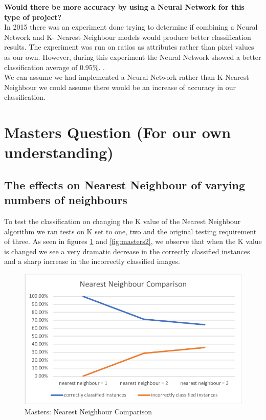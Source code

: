 \documentclass[12pt]{article}
\begin{document}
\textbf{Would there be more accuracy by using a Neural Network for this type of project?}\\

In 2015 there was an experiment done trying to determine if combining a Neural Network and K- Nearest Neighbour models would produce better classification results. The experiment was run on ratios as attributes rather than pixel values as our own. However, during this experiment the Neural Network showed a better classification average of 0.95\%. \cite{hai_2015}.\\

We can assume we had implemented a Neural Network rather than K-Nearest Neighbour we could assume there would be an increase of accuracy in our classification.\\


\section{Masters Question (For our own understanding)}

\subsection{The effects on Nearest Neighbour of varying numbers of neighbours}

To test the classification on changing the K value of the Nearest Neighbour algorithm we ran tests on K set to one, two and the original testing requirement of three. As seen in figures \ref{fig:masters1} and \ref{fig:masters2}, we observe that when the K value is changed we see a very dramatic decrease in the correctly classified instances and a sharp increase in the incorrectly classified images.\\

\begin{figure}[H]
	\centering
	\includegraphics[width=0.7\linewidth]{images/masters1}
	\caption{Masters: Nearest Neighbour Comparison}
	\label{fig:masters1}
\end{figure}
\end{document}
